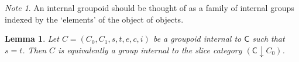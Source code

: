 \documentclass[a4paper,10pt]{scrreprt}
\theoremstyle{definition}
\theoremstyle{plain}
\newtheorem{lemma}{Lemma}[section]
\theoremstyle{remark}
\newtheorem{note}{Note}[section]
\begin{document}
\begin{note}
  An internal groupoid should be thought of as a family of internal groups indexed by the `elements' of the object of objects. 
\end{note}

\begin{lemma}
  \label{lemma:interalgroupoidsaregroupobjectsinslicecategory}
  Let $C = (C_{0}, C_{1}, s, t, e, c, i)$ be a groupoid internal to $\mathsf{C}$ such that $s = t$. Then $C$ is equivalently a group internal to the slice category $(\mathsf{C} \downarrow C_{0})$.
\end{lemma}

%
%
%
%
\end{document}
